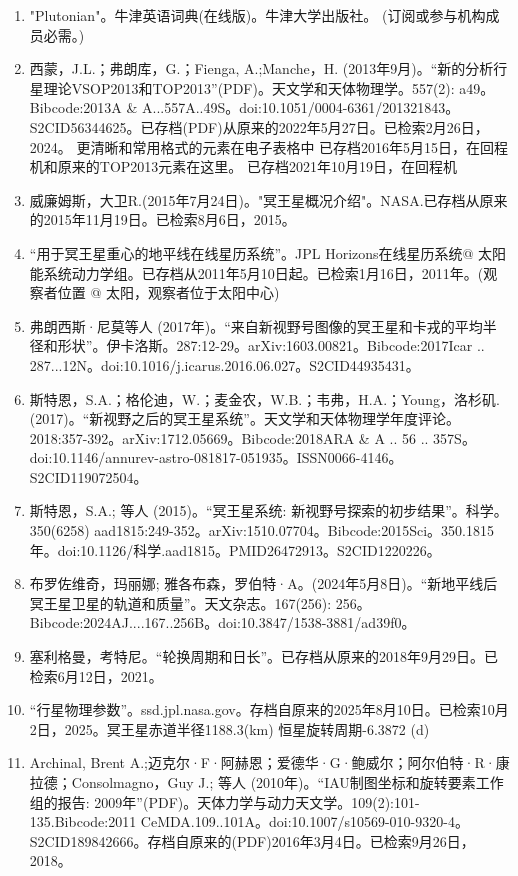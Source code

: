 \begin{enumerate}
\item "Plutonian"。牛津英语词典(在线版)。牛津大学出版社。 (订阅或参与机构成员必需。)
\item 西蒙，J.L.；弗朗库，G.；Fienga, A.;Manche，H. (2013年9月)。“新的分析行星理论VSOP2013和TOP2013”(PDF)。天文学和天体物理学。557(2): a49。Bibcode:2013A & A...557A..49S。doi:10.1051/0004-6361/201321843。S2CID56344625。已存档(PDF)从原来的2022年5月27日。已检索2月26日，2024。   更清晰和常用格式的元素在电子表格中 已存档2016年5月15日，在回程机和原来的TOP2013元素在这里。 已存档2021年10月19日，在回程机
\item 威廉姆斯，大卫R.(2015年7月24日)。"冥王星概况介绍"。NASA.已存档从原来的2015年11月19日。已检索8月6日，2015。
\item “用于冥王星重心的地平线在线星历系统”。JPL Horizons在线星历系统@ 太阳能系统动力学组。已存档从2011年5月10日起。已检索1月16日，2011年。(观察者位置 @ 太阳，观察者位于太阳中心)
\item 弗朗西斯·尼莫等人 (2017年)。“来自新视野号图像的冥王星和卡戎的平均半径和形状”。伊卡洛斯。287:12-29。arXiv:1603.00821。Bibcode:2017Icar .. 287...12N。doi:10.1016/j.icarus.2016.06.027。S2CID44935431。 
\item 斯特恩，S.A.；格伦迪，W.；麦金农，W.B.；韦弗，H.A.；Young，洛杉矶.(2017)。“新视野之后的冥王星系统”。天文学和天体物理学年度评论。2018:357-392。arXiv:1712.05669。Bibcode:2018ARA & A .. 56 .. 357S。doi:10.1146/annurev-astro-081817-051935。ISSN0066-4146。S2CID119072504。  
\item 斯特恩，S.A.; 等人 (2015)。“冥王星系统: 新视野号探索的初步结果”。科学。350(6258) aad1815:249-352。arXiv:1510.07704。Bibcode:2015Sci。350.1815年。doi:10.1126/科学.aad1815。PMID26472913。S2CID1220226。  
\item 布罗佐维奇，玛丽娜; 雅各布森，罗伯特·A。(2024年5月8日)。“新地平线后冥王星卫星的轨道和质量”。天文杂志。167(256): 256。Bibcode:2024AJ....167..256B。doi:10.3847/1538-3881/ad39f0。
\item 塞利格曼，考特尼。“轮换周期和日长”。已存档从原来的2018年9月29日。已检索6月12日，2021。
\item “行星物理参数”。ssd.jpl.nasa.gov。存档自原来的2025年8月10日。已检索10月2日，2025。冥王星赤道半径1188.3(km) 恒星旋转周期-6.3872 (d)
\item Archinal, Brent A.;迈克尔·F·阿赫恩；爱德华·G·鲍威尔；阿尔伯特·R·康拉德；Consolmagno，Guy J.; 等人 (2010年)。“IAU制图坐标和旋转要素工作组的报告: 2009年”(PDF)。天体力学与动力天文学。109(2):101-135.Bibcode:2011 CeMDA.109..101A。doi:10.1007/s10569-010-9320-4。S2CID189842666。存档自原来的(PDF)2016年3月4日。已检索9月26日，2018。  

\end{enumerate}
